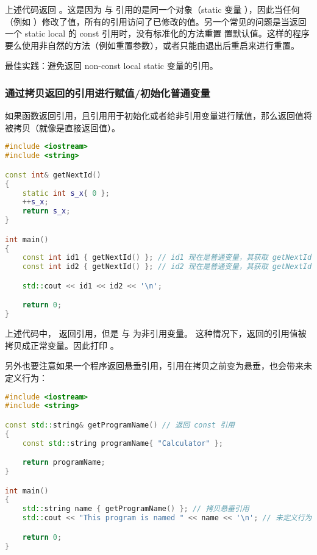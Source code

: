 \documentclass[../../LearnCpp.tex]{subfiles}
\begin{document}
上述代码返回 。这是因为  与  引用的是同一个对象（static 变量 ），因此当任何（例如 ）修改了值，所有的引用访问了已修改的值。另一个常见的问题是当返回一个 static local 的 const 引用时，没有标准化的方法重置  置默认值。这样的程序要么使用非自然的方法（例如重置参数），或者只能由退出后重启来进行重置。

最佳实践：避免返回 non-const local static 变量的引用。

\subsubsection*{通过拷贝返回的引用进行赋值/初始化普通变量}

如果函数返回引用，且引用用于初始化或者给非引用变量进行赋值，那么返回值将被拷贝（就像是直接返回值）。

\begin{lstlisting}[language=C++]
#include <iostream>
#include <string>

const int& getNextId()
{
    static int s_x{ 0 };
    ++s_x;
    return s_x;
}

int main()
{
    const int id1 { getNextId() }; // id1 现在是普通变量，其获取 getNextId() 返回的引用并进行值拷贝
    const int id2 { getNextId() }; // id2 现在是普通变量，其获取 getNextId() 返回的引用并进行值拷贝

    std::cout << id1 << id2 << '\n';

    return 0;
}
\end{lstlisting}

上述代码中， 返回引用，但是  与  为非引用变量。
这种情况下，返回的引用值被拷贝成正常变量。因此打印 。

另外也要注意如果一个程序返回悬垂引用，引用在拷贝之前变为悬垂，也会带来未定义行为：

\begin{lstlisting}[language=C++]
#include <iostream>
#include <string>

const std::string& getProgramName() // 返回 const 引用
{
    const std::string programName{ "Calculator" };

    return programName;
}

int main()
{
    std::string name { getProgramName() }; // 拷贝悬垂引用
    std::cout << "This program is named " << name << '\n'; // 未定义行为

    return 0;
}
\end{lstlisting}
\end{document}

